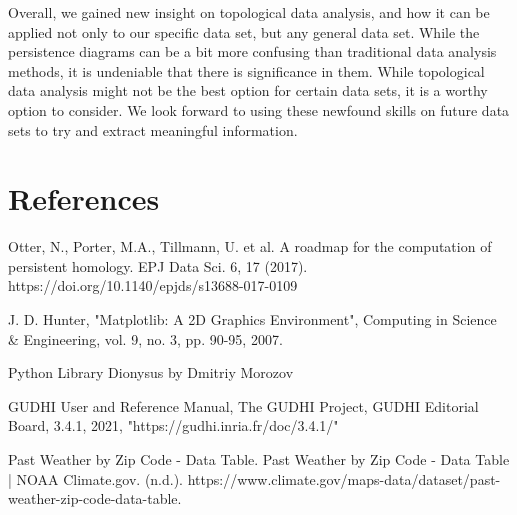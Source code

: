 \documentclass[12pt]{report}
\begin{document}
Overall, we gained new insight on topological data analysis, and how it can be applied not only to our specific data set, but any general data set. While the persistence diagrams can be a bit more confusing than traditional data analysis methods, it is undeniable that there is significance in them. While topological data analysis might not be the best option for certain data sets, it is a worthy option to consider. We look forward to using these newfound skills on future data sets to try and extract meaningful information.\par
\clearpage
\section*{References}

Otter, N., Porter, M.A., Tillmann, U. et al. A roadmap for the computation of persistent homology. EPJ Data Sci. 6, 17 (2017). https://doi.org/10.1140/epjds/s13688-017-0109\par

 J. D. Hunter, "Matplotlib: A 2D Graphics Environment", Computing in Science & Engineering, vol. 9, no. 3, pp. 90-95, 2007.\par
\setlength{\parindent}{0cm}
Python Library Dionysus by Dmitriy Morozov 
\setlength{\parindent}{default}

GUDHI User and Reference Manual, The GUDHI Project, GUDHI Editorial Board, 3.4.1, 2021, "https://gudhi.inria.fr/doc/3.4.1/"\par

Past Weather by Zip Code - Data Table. Past Weather by Zip Code - Data Table | NOAA Climate.gov. (n.d.). https://www.climate.gov/maps-data/dataset/past-weather-zip-code-data-table. \par


\clearpage
\end{document}
